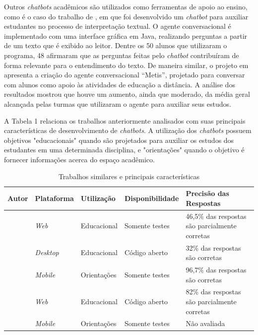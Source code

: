 \documentclass[12pt]{article}
\begin{document}
Outros {\itshape chatbots} acadêmicos são utilizados como ferramentas de apoio ao ensino, como é o caso do trabalho de \cite{bulhoes:20}, em que  foi desenvolvido um {\itshape chatbot} para auxiliar estudantes no processo de interpretação textual. O agente conversacional é implementado com uma interface gráfica em Java, realizando perguntas a partir de um texto que é exibido ao leitor. Dentre os 50 alunos que utilizaram o programa, 48 afirmaram que as perguntas feitas pelo  {\itshape chatbot} contribuíram de forma relevante para o entendimento do texto. De maneira similar, o projeto em  \cite{lucchesi:18} apresenta a criação do agente conversacional “Metis”, projetado para conversar com alunos como apoio às atividades de educação a distância. A análise dos resultados mostrou que houve um aumento, ainda que moderado, da média geral alcançada pelas turmas que utilizaram o agente para auxiliar seus estudos.

A Tabela 1 relaciona os trabalhos anteriormente analisados com suas principais características de desenvolvimento de {\itshape chatbots}. A utilização dos {\itshape chatbots} possuem objetivos "educacionais" quando são projetados para auxiliar os estudos dos estudantes em uma determinada disciplina, e "orientações" quando o objetivo é fornecer informações acerca do espaço acadêmico.

\begin{table}[h]
\caption{Trabalhos similares e principais características}
\label{table:1}
\begin{tabular}{ |p{3cm}|p{1.9cm}|p{2cm}|p{2.6cm}|p{3.4cm}|  }
 \hline
Autor & Plataforma & Utilização & Disponibilidade & Precisão das Respostas\\
 \hline
 \cite{araujo:20}   & {\itshape Web}    & Educacional &   Somente testes & 46,5\% das respostas são parcialmente corretas\\
  \hline
 \cite{bulhoes:20}&   {\itshape Desktop}  & Educacional   & Código aberto & 32\% das respostas são corretas
\\
 \hline
 \cite{silva:21} & {\itshape Mobile} & Orientações &  Somente testes & 96,7\% das respostas são corretas
\\
 \hline
 \cite{lucchesi:18}    & {\itshape Web} & Educacional & Código aberto & 82\% das respostas são parcialmente corretas \\
  \hline
 \cite{maciel:19}  & {\itshape Mobile}  & Orientações & Somente testes & Não avaliada
 \\
 \hline
\end{tabular}
\end{table}
\end{document}
